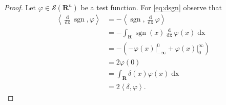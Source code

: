 \documentclass[a4paper, 11pt]{scrartcl}
\begin{document}
\begin{proof}
  Let $\varphi \in \mathcal{S}(\mathbf{R}^n)$ be a test function.
  For \eqref{eq:dsgn} observe that
  \begin{align*}
    \left<\frac{\operatorname{d}}{\operatorname{dx}}\operatorname{sgn},\varphi\right> &= -\left<\operatorname{sgn},\frac{\operatorname{d}}{\operatorname{dx}}\varphi\right> \\
    &=  -\int_\mathbf{R}\operatorname{sgn}(x)\frac{\operatorname{d}}{\operatorname{dx}}\varphi(x)\operatorname{dx} \\
    &= -(-\varphi(x)\rvert_{-\infty}^0+\varphi(x)\rvert_{0}^\infty) \\
    &= 2\varphi(0) \\
    &= \int_\mathbf{R}\delta(x)\varphi(x)\operatorname{dx}\\
    &= 2\left<\delta,\varphi\right>.
  \end{align*}
\end{proof}
\end{document}
